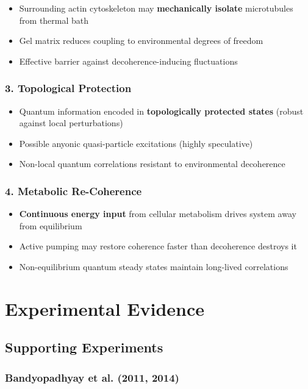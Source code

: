 \begin{itemize}
\item Surrounding actin cytoskeleton may \textbf{mechanically isolate} microtubules from thermal bath
\item Gel matrix reduces coupling to environmental degrees of freedom
\item Effective barrier against decoherence-inducing fluctuations
\end{itemize}

\subsubsection{3. Topological Protection}

\begin{itemize}
\item Quantum information encoded in \textbf{topologically protected states} (robust against local perturbations)
\item Possible anyonic quasi-particle excitations (highly speculative)
\item Non-local quantum correlations resistant to environmental decoherence
\end{itemize}

\subsubsection{4. Metabolic Re-Coherence}

\begin{itemize}
\item \textbf{Continuous energy input} from cellular metabolism drives system away from equilibrium
\item Active pumping may restore coherence faster than decoherence destroys it
\item Non-equilibrium quantum steady states maintain long-lived correlations
\end{itemize}

\section{Experimental Evidence}

\subsection{Supporting Experiments}

\subsubsection{Bandyopadhyay et al. (2011, 2014)}

